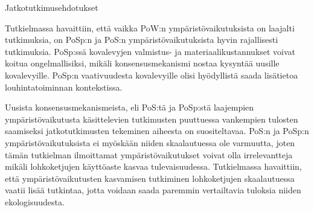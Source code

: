 \begin{section}{Jatkotutkimusehdotukset\label{jatkotutkimus}}

Tutkielmassa havaittiin, että vaikka PoW:n ympäristövaikutuksista on laajalti tutkimuksia, on PoSp:n ja PoS:n ympäristövaikutuksista hyvin rajallisesti tutkimuksia. PoSp:ssä kovalevyjen valmistus- ja materiaalikustannukset voivat koitua ongelmallisiksi, mikäli konsensusmekanismi nostaa kysyntää uusille kovalevyille. PoSp:n vaativuudesta kovalevyille olisi hyödyllistä saada lisätietoa louhintatoiminnan kontekstissa.

Uusista konsensusmekanismeista, eli PoS:tä ja PoSp:stä laajempien ympäristövaikutusta käsittelevien tutkimusten puuttuessa vankempien tulosten saamiseksi jatkotutkimusten tekeminen aiheesta on suositeltavaa. PoS:n ja PoSp:n ympäristövaikutuksista ei myöskään niiden skaalautuessa ole varmuutta, joten tämän tutkielman ilmoittamat ympäristövaikutukset voivat olla irrelevantteja mikäli lohkoketjujen käyttöaste kasvaa tulevaisuudessa. Tutkielmassa havaittiin, että ympäristövaikutusten kasvamisen tutkiminen lohkoketjujen skaalautuessa vaatii lisää tutkintaa, jotta voidaan saada paremmin vertailtavia tuloksia niiden ekologisuudesta.

\end{section}